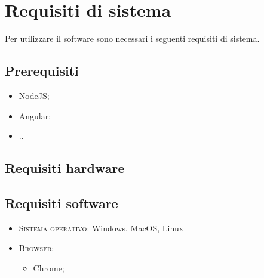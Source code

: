 \section{Requisiti di sistema}
Per utilizzare il software sono necessari i seguenti requisiti di sistema.
\subsection{Prerequisiti}
    \begin{itemize}
        \item NodeJS;
        \item Angular;
        \item ..
    \end{itemize}
\subsection{Requisiti hardware}

\subsection{Requisiti software}
\begin{itemize}
    \item \textsc{Sistema operativo}: Windows, MacOS, Linux
    \item \textsc{Browser}: 
    \begin{itemize}
        \item Chrome;
    \end{itemize}
\end{itemize}